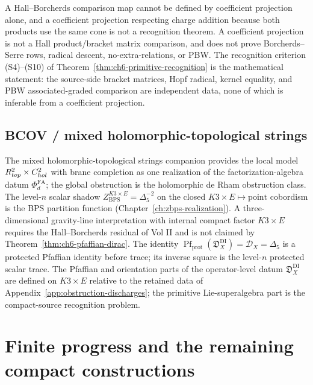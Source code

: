 \begin{remark}
\label{rmk:ch6-coefficient-projection}
A Hall--Borcherds comparison map cannot be defined by coefficient
projection alone, and a coefficient projection respecting charge
addition because both products use the same cone is not a recognition
theorem.  A coefficient projection is not a Hall product/bracket matrix
comparison, and does not prove Borcherds--Serre rows, radical descent,
no-extra-relations, or PBW.  The recognition criterion (S4)--(S10) of
Theorem~\ref{thm:ch6-primitive-recognition} is the mathematical
statement:
the source-side bracket matrices, Hopf radical, kernel equality, and
PBW associated-graded comparison are independent data, none of which is
inferable from a coefficient projection.
\end{remark}

\subsection{BCOV / mixed holomorphic-topological strings}
\label{subsec:ch6-bcov}

The mixed holomorphic-topological strings companion provides the local
model \(R^2_{top}\times C^2_{hol}\) with brane
completion as one realization of the factorization-algebra datum
\(\Phi_d^{\mathrm{FA}}\); the global obstruction is the holomorphic
de Rham obstruction class.  The level-\(n\) scalar shadow
\(Z_{\mathrm{BPS}}^{K3\times E}=\Delta_5^{-2}\) on the closed
\(K3\times E\mapsto\mathrm{point}\) cobordism is the BPS partition
function (Chapter~\ref{ch:zbps-realization}).  A three-dimensional
gravity-line interpretation with internal compact factor \(K3\times E\)
requires the Hall--Borcherds residual of Vol II and is not claimed by
Theorem~\ref{thm:ch6-pfaffian-dirac}.  The identity
\(\operatorname{Pf}_{\mathrm{prot}}(\mathfrak D_X^{\mathrm{DI}})=\mathcal D_X=\Delta_5\)
is a protected Pfaffian identity before trace; its inverse square is
the level-\(n\) protected scalar trace.  The Pfaffian and orientation
parts of the operator-level datum \(\mathfrak D_X^{\mathrm{DI}}\) are
defined on \(K3\times E\)
relative to the retained data of
Appendix~\ref{app:obstruction-discharges}; the primitive Lie-superalgebra
part is the compact-source recognition problem.

\section{Finite progress and the remaining compact constructions}
\label{sec:ch6-residuals}

